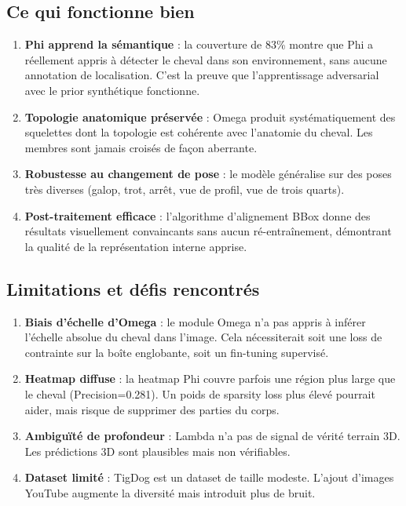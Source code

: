 \documentclass[12pt,a4paper]{article}
\begin{document}
\subsection{Ce qui fonctionne bien}

\begin{enumerate}
  \item \textbf{Phi apprend la sémantique} : la couverture de 83\% montre que Phi
  a réellement appris à détecter le cheval dans son environnement, sans aucune
  annotation de localisation. C'est la preuve que l'apprentissage adversarial avec
  le prior synthétique fonctionne.

  \item \textbf{Topologie anatomique préservée} : Omega produit systématiquement des
  squelettes dont la topologie est cohérente avec l'anatomie du cheval. Les membres
  sont jamais croisés de façon aberrante.

  \item \textbf{Robustesse au changement de pose} : le modèle généralise sur des
  poses très diverses (galop, trot, arrêt, vue de profil, vue de trois quarts).

  \item \textbf{Post-traitement efficace} : l'algorithme d'alignement BBox donne
  des résultats visuellement convaincants sans aucun ré-entraînement, démontrant
  la qualité de la représentation interne apprise.
\end{enumerate}

\subsection{Limitations et défis rencontrés}

\begin{enumerate}
  \item \textbf{Biais d'échelle d'Omega} : le module Omega n'a pas appris à inférer
  l'échelle absolue du cheval dans l'image. Cela nécessiterait soit une loss de
  contrainte sur la boîte englobante, soit un fin-tuning supervisé.

  \item \textbf{Heatmap diffuse} : la heatmap Phi couvre parfois une région plus
  large que le cheval (Precision=0.281). Un poids de sparsity loss plus élevé
  pourrait aider, mais risque de supprimer des parties du corps.

  \item \textbf{Ambiguïté de profondeur} : Lambda n'a pas de signal de vérité
  terrain 3D. Les prédictions 3D sont plausibles mais non vérifiables.

  \item \textbf{Dataset limité} : TigDog est un dataset de taille modeste. L'ajout
  d'images YouTube augmente la diversité mais introduit plus de bruit.
\end{enumerate}
\end{document}
